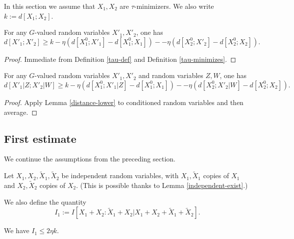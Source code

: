 In this section we assume that $X_1,X_2$ are $\tau$-minimizers. We also write $k := d[X_1;X_2]$.

\begin{lemma}\label{distance-lower}
  For any $G$-valued random variables $X'_1,X'_2$, one has
$$ d[X'_1;X'_2] \geq k - \eta (d[X^0_1;X'_1] - d[X^0_1;X_1] ) - - \eta (d[X^0_2;X'_2] - d[X^0_2;X_2] ).$$
\end{lemma}

\begin{proof}
  Immediate from Definition \ref{tau-def} and Definition \ref{tau-minimizes}.
\end{proof}

\begin{lemma}\label{cond-distance-lower}
  For any $G$-valued random variables $X'_1,X'_2$ and random variables $Z,W$, one has
$$ d[X'_1|Z;X'_2|W] \geq k - \eta (d[X^0_1;X'_1|Z] - d[X^0_1;X_1] ) - - \eta (d[X^0_2;X'_2|W] - d[X^0_2;X_2] ).$$
\end{lemma}

\begin{proof}  Apply Lemma \ref{distance-lower} to conditioned random variables and then average.
\end{proof}

\subsection{First estimate}

We continue the assumptions from the preceding section.

Let $X_1, X_2, \tilde X_1, \tilde X_2$ be independent random variables, with $X_1,\tilde X_1$ copies of $X_1$ and $X_2,\tilde X_2$ copies of $X_2$.  (This is possible thanks to Lemma \ref{independent-exist}.)

We also define the quantity
$$ I_1 :=  I [ X_1+X_2 : \tilde X_1 + X_2 | X_1+X_2+\tilde X_1+\tilde X_2 ].$$


\begin{lemma}\label{first-estimate}
   We have $I_1 \leq 2 \eta k$.
\end{lemma}


